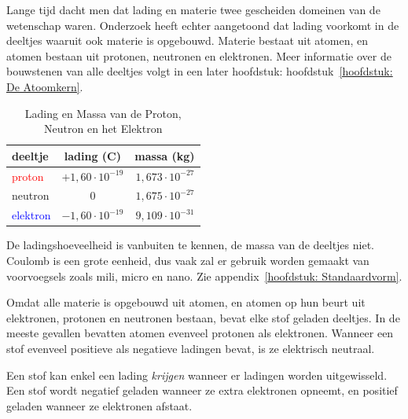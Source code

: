 Lange tijd dacht men dat lading en materie twee gescheiden domeinen van de wetenschap waren. Onderzoek heeft echter aangetoond dat lading voorkomt in de deeltjes waaruit ook materie is opgebouwd. Materie bestaat uit atomen, en atomen bestaan uit protonen, neutronen en elektronen. Meer informatie over de bouwstenen van alle deeltjes volgt in een later hoofdstuk: hoofdstuk~\ref{hoofdstuk: De Atoomkern}.

\begin{table}[h!]
\caption{Lading en Massa van de Proton, Neutron en het Elektron}
\centering
\begin{tabular}{@{}lcr@{}}
	\toprule
	deeltje & lading (C) & massa (kg)\\
	\midrule
	\textcolor{red}{proton} & $+1,60\cdot 10^{-19}$ & $1,673\cdot 10^{-27}$ \\
	neutron & 0 & $1,675\cdot 10^{-27}$ \\
	\textcolor{blue}{elektron} & $-1,60\cdot 10^{-19}$ & $9,109\cdot 10^{-31}$ \\
	\bottomrule
\end{tabular}
\vspace{2mm}
	\begin{opm}
		De ladingshoeveelheid is vanbuiten te kennen, de massa van de deeltjes niet. Coulomb is een grote eenheid, dus vaak zal er gebruik worden gemaakt van voorvoegsels zoals mili, micro en nano. Zie appendix~\ref{hoofdstuk: Standaardvorm}.
	\end{opm}
\end{table}


Omdat alle materie is opgebouwd uit atomen, en atomen op hun beurt uit elektronen, protonen en neutronen bestaan, bevat elke stof geladen deeltjes. In de meeste gevallen bevatten atomen evenveel protonen als elektronen. Wanneer een stof evenveel positieve als negatieve ladingen bevat, is ze elektrisch neutraal.

Een stof kan enkel een lading \textit{krijgen} wanneer er ladingen worden uitgewisseld. Een stof wordt negatief geladen wanneer ze extra elektronen opneemt, en positief geladen wanneer ze elektronen afstaat.

